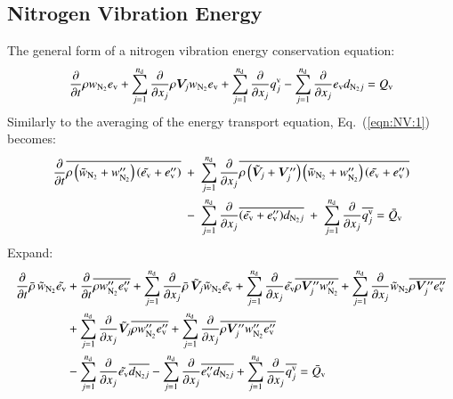 \documentclass{warpdoc}
\newcommand{\alb}{\vspace{0.2cm}\\} %
\newcommand{\nd}{{{n}_{\rm d}}}
\newcommand{\mfd}{\displaystyle}
\newcommand{\ev}{e_{\rm v}}
\newcommand{\cNtwo}{w_{\rm N_2}}
\begin{document}
\subsection{Nitrogen Vibration Energy}


The general form of a nitrogen vibration energy conservation equation:
%
\begin{equation}
  \mfd\frac{\partial}{\partial t}  {\rho}  w_{\rm N_2} {\ev}
      +  \sum_{j=1}^{\nd} \frac{\partial }{\partial x_j}
        {\rho}  {\bm{V}_j} w_{\rm N_2} \ev
      + \sum_{j=1}^{\nd}\frac{\partial }{\partial x_j} q^{\rm v}_j
      - \sum_{j=1}^{\nd}\frac{\partial }{\partial x_j} e_{\rm v} d_{{\rm N_2}j}
      = Q_{\rm v}
  \label{eqn:NV:1}
\end{equation}
%
Similarly to the averaging of the energy transport equation, Eq.\ (\ref{eqn:NV:1}) becomes:
%
\begin{align*}
    \frac{\partial}{\partial t} \overline{\rho \left({\wtilde{w}_{\rm N_2}} + \cNtwo^{\prime\prime} \right) \left( \wtilde{\ev} +\ev^{\prime\prime} \right)}
&~+~\sum_{j=1}^{\nd} \frac{\partial}{\partial x_j} \overline{ \rho \left( {\wtilde{\bm{V}}_j}+\bm{V}_j^{\prime\prime} \right)  \left( {\wtilde{w}_{\rm N_2}}+\cNtwo^{\prime\prime} \right) \left( \wtilde{\ev} + \ev^{\prime\prime} \right) }\alb
&~-~ \sum_{j=1}^{\nd} \frac{\partial }{\partial x_j} \overline{(\wtilde{\ev}+\ev^{\prime\prime}) d_{{\rm N_2}j} }
~+~ \sum_{j=1}^{\nd} \frac{\partial }{\partial x_j} \overline{q_j^{\rm v}} = \wbar{Q}_{\rm v}
\end{align*}
%
Expand:
%
\begin{align*}
    \frac{\partial}{\partial t} \wbar{\rho}\, {\wtilde{w}_{\rm N_2}}  \wtilde{\ev}
&+    \frac{\partial}{\partial t} \overline{\rho \cNtwo^{\prime\prime}   \ev^{\prime\prime}}
+\sum_{j=1}^{\nd} \frac{\partial}{\partial x_j} \wbar{\rho}\, {\wtilde{\bm{V}}_j} {\wtilde{w}_{\rm N_2}} {\wtilde{\ev}}
       +\sum_{j=1}^{\nd} \frac{\partial}{\partial x_j}{\wtilde{\ev}} \overline{\rho \bm{V}_j^{\prime\prime} \cNtwo^{\prime\prime}}+\sum_{j=1}^{\nd} \frac{\partial}{\partial x_j}{\wtilde{w}_{\rm N_2}} \overline{\rho \bm{V}_j^{\prime\prime} \ev^{\prime\prime}}\alb
%
       &+\sum_{j=1}^{\nd} \frac{\partial}{\partial x_j}{\wtilde{\bm{V}}_j} \overline{\rho \cNtwo^{\prime\prime} \ev^{\prime\prime}}
       +\sum_{j=1}^{\nd} \frac{\partial}{\partial x_j}\overline{\rho \bm{V}_j^{\prime\prime} \cNtwo^{\prime\prime} \ev^{\prime\prime}} \alb
%
   &- \sum_{j=1}^{\nd} \frac{\partial }{\partial x_j} \wtilde{\ev} \overline{d_{{\rm N_2}j}}
   - \sum_{j=1}^{\nd} \frac{\partial }{\partial x_j} \overline{\ev^{\prime\prime} d_{{\rm N_2}j}}
         + \sum_{j=1}^{\nd} \frac{\partial }{\partial x_j} \overline{q_j^{\rm v}} = \wbar{Q}_{\rm v}
\end{align*}
\end{document}
